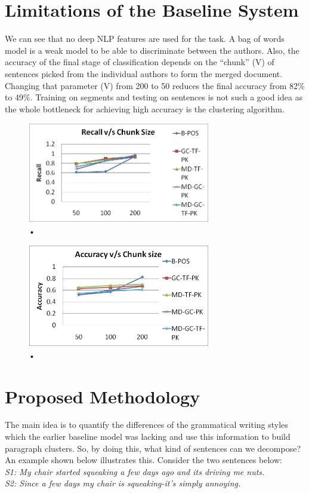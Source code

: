 \documentclass[letterpaper]{article}
\begin{document}
\section{Limitations of the Baseline System}
We can see that no deep NLP features are used for the task. A bag of words model is a weak model to be able to discriminate between the authors. Also, the accuracy of the final stage of classification depends on the “chunk” (V) of sentences picked from the individual authors to form the merged document. Changing that parameter (V) from 200 to 50 reduces the final accuracy from 82\% to 49\%. Training on segments and testing on sentences is not such a good idea as the whole bottleneck for achieving high accuracy is the clustering algorithm.
\begin{figure}
\caption{•}
\includegraphics[width=8cm]{u4.jpg}
\centering
\end{figure}
\begin{figure}
\caption{•}
\includegraphics[width=8cm]{u5.jpg}
\centering
\end{figure}

\section{Proposed Methodology}
The main idea is to quantify the differences of the grammatical writing styles which the earlier baseline model was lacking and use this information to build paragraph clusters. So, by doing this, what kind of sentences can we decompose? An example shown below illustrates this. Consider the two sentences below:\\
\textit{S1: My chair started squeaking a few days ago and its driving me nuts.\\
S2: Since a few days my chair is squeaking-it’s simply annoying.\\}
\end{document}
